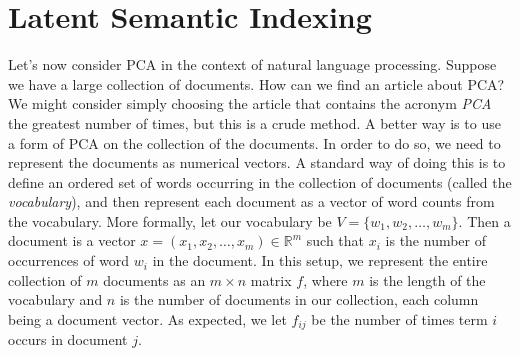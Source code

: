 \section*{Latent Semantic Indexing}
Let's now consider PCA in the context of natural language processing.
Suppose we have a large collection of documents. How can we find an article about PCA?
We might consider simply choosing the article that contains the acronym \emph{PCA} the greatest number of times, but this is a crude method.
A better way is to use a form of PCA on the collection of the documents.
In order to do so, we need to represent the documents as numerical vectors.
A standard way of doing this is to define an ordered set of words occurring in the collection of documents (called the \emph{vocabulary}), and then
represent each document as a vector of word counts from the vocabulary.
More formally, let our vocabulary be $V = \{w_1,w_2,\ldots,w_m\}$.
Then a document is a vector $x  = (x_1,x_2,\ldots,x_m) \in \mathbb{R}^m$ such that $x_i$ is the number of occurrences of word $w_i$ in the document.
In this setup, we represent the entire collection of $m$ documents as an $m \times n$ matrix $f$, where $m$ is the length of the vocabulary and $n$ is the number of documents in our collection, each column being a document vector. As expected, we let $f_{ij}$ be the number of times term $i$ occurs in document $j$.

